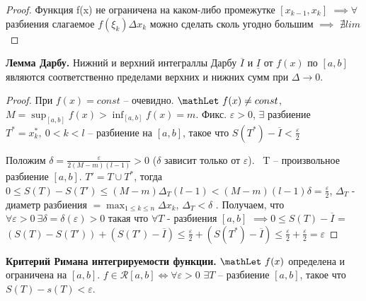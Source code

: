 \begin{proof}
Функция f(x) не ограничена на каком-либо промежутке $[x_{k-1}, x_k]$ $\implies \forall$ разбиения слагаемое $f(\xi_k)\Delta x_k$ можно сделать сколь угодно большим $\implies$ $\nexists lim$
\end{proof}

\bigbreak
\textbf{Лемма Дарбу.} Нижний и верхний интеграллы Дарбу $\overline{I}$ и $\underline{I}$ от $f(x)$ по $[a, b]$ являются соответственно пределами верхних и нижних сумм при $\Delta \to 0$.

\begin{proof}
При $f(x) = const$ -- очевидно. $\mathLet ~ f(x) \neq const$, $M = \sup_{[a, b]}f(x) > \inf_{[a,b]}f(x) = m$. 
Фикс. $\varepsilon > 0$, $\exists$ разбиение $T^* = {x_k^*}, ~ 0<k<l$ -- разбиение на $[a, b]$, такое что $S(T^*) - \overline{I} < \frac{\varepsilon}{2}$

Положим $\delta = \frac{\varepsilon}{2(M - m)(l - 1)} > 0 $ ($\delta$ зависит только от $\varepsilon$). 
\mathLet \ T -- произвольное разбиение $[a, b]$. $T' = T \cup T^*$, тогда $0 \leq S(T) - S(T') \leq (M - m)\Delta_T(l-1) < (M - m)(l - 1)\delta = \frac{\varepsilon}{2}$, $\Delta_T$ - диаметр разбиения $ = \max_{1\leq k \leq n}\Delta x_k$, $\Delta_T < \delta$ .
Получаем, что $\forall\varepsilon > 0  ~ \exists\delta=\delta(\varepsilon) > 0$ такая что $\forall T$ - разбиения $[a, b]$ 
$\implies 0 \leq S(T) - \overline{I}$ = $(S(T) - S(T')) + (S(T') - \overline{I}) \leq \frac{\varepsilon}{2} + (S(T^*) - \overline{I}) \leq \frac{\varepsilon}{2} + \frac{\varepsilon}{2} = \varepsilon$
\end{proof}

\bigbreak
\textbf{Критерий Римана интегрируемости функции.} $\mathLet ~ f(x)$ определена и ограничена на $[a,b]$. $f\in \mathcal{R}[a, b] \iff \forall \varepsilon > 0$ $\exists T$ -- разбиение $[a, b]$, такое что $S(T) - s(T) < \varepsilon$.

